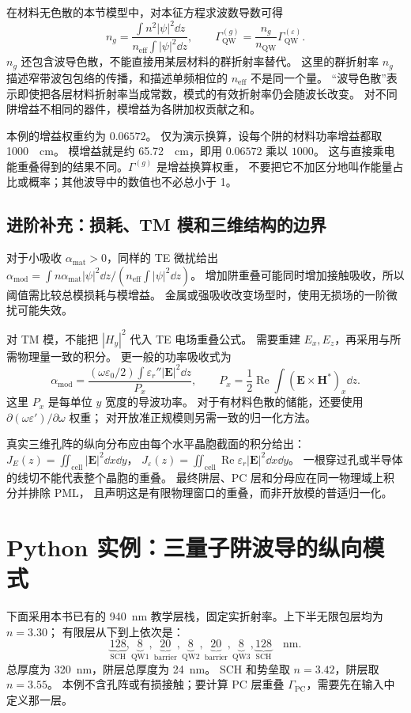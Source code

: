 在材料无色散的本节模型中，对本征方程求波数导数可得
\[
n_g=\frac{\int n^2|\psi|^2\dd z}{n_{\mathrm{eff}}\int|\psi|^2\dd z},
\qquad
\Gamma_{\mathrm{QW}}^{(g)}
=\frac{n_g}{n_{\mathrm{QW}}}\Gamma_{\mathrm{QW}}^{(\varepsilon)}.
\]
$n_g$ 还包含波导色散，不能直接用某层材料的群折射率替代。
这里的群折射率 $n_g$ 描述窄带波包包络的传播，和描述单频相位的 $n_{\mathrm{eff}}$ 不是同一个量。
“波导色散”表示即使把各层材料折射率当成常数，模式的有效折射率仍会随波长改变。
对不同阱增益不相同的器件，模增益为各阱加权贡献之和。

本例的增益权重约为 $0.06572$。
仅为演示换算，设每个阱的材料功率增益都取 \SI{1000}{\per\centi\meter}。
模增益就是约 \SI{65.72}{\per\centi\meter}，即用 $0.06572$ 乘以 $1000$。
这与直接乘电能重叠得到的结果不同。$\Gamma^{(g)}$ 是增益换算权重，
不要把它不加区分地叫作能量占比或概率；其他波导中的数值也不必总小于 1。

\subsection{进阶补充：损耗、TM 模和三维结构的边界}
对于小吸收 $\alpha_{\mathrm{mat}}>0$，同样的 TE 微扰给出
$\alpha_{\mathrm{mod}}=\int n\alpha_{\mathrm{mat}}|\psi|^2\dd z/
(n_{\mathrm{eff}}\int|\psi|^2\dd z)$。
增加阱重叠可能同时增加接触吸收，所以阈值需比较总模损耗与模增益。
金属或强吸收改变场型时，使用无损场的一阶微扰可能失效。

对 TM 模，不能把 $|H_y|^2$ 代入 TE 电场重叠公式。
需要重建 $E_x,E_z$，再采用与所需物理量一致的积分。
更一般的功率吸收式为
\[
\alpha_{\mathrm{mod}}=
\frac{(\omega\varepsilon_0/2)\int\varepsilon_r''|\mathbf E|^2\dd z}
{P_x},\qquad
P_x=\frac12\operatorname{Re}\int(\mathbf E\times\mathbf H^*)_x\dd z.
\]
这里 $P_x$ 是每单位 $y$ 宽度的导波功率。
对于有材料色散的储能，还要使用
$\partial(\omega\varepsilon')/\partial\omega$ 权重；
对开放准正规模则另需一致的归一化方法。

真实三维孔阵的纵向分布应由每个水平晶胞截面的积分给出：
$J_E(z)=\iint_{\mathrm{cell}}|\mathbf E|^2\dd x\dd y$，
$J_\varepsilon(z)=\iint_{\mathrm{cell}}\operatorname{Re}\varepsilon_r
|\mathbf E|^2\dd x\dd y$。
一根穿过孔或半导体的线切不能代表整个晶胞的重叠。
最终阱层、PC 层和分母应在同一物理域上积分并排除 PML，
且声明这是有限物理窗口的重叠，而非开放模的普适归一化。

\section{Python 实例：三量子阱波导的纵向模式}
\label{sec:vertical-python}
下面采用本书已有的 \SI{940}{nm} 教学层栈，固定实折射率。上下半无限包层均为 $n=3.30$；
有限层从下到上依次是：
\[
\underbrace{128}_{\mathrm{SCH}},
\underbrace{8}_{\mathrm{QW1}},
\underbrace{20}_{\mathrm{barrier}},
\underbrace{8}_{\mathrm{QW2}},
\underbrace{20}_{\mathrm{barrier}},
\underbrace{8}_{\mathrm{QW3}},
\underbrace{128}_{\mathrm{SCH}}\quad\mathrm{nm}.
\]
总厚度为 \SI{320}{nm}，阱层总厚度为 \SI{24}{nm}。
SCH 和势垒取 $n=3.42$，阱层取 $n=3.55$。
本例不含孔阵或有损接触；要计算 PC 层重叠 $\Gamma_{\mathrm{PC}}$，需要先在输入中定义那一层。

